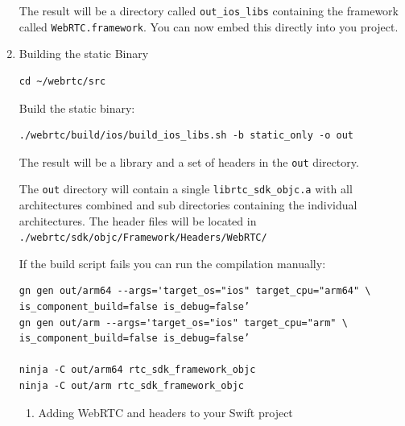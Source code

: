 \documentclass[a4paper,11pt]{article}
\begin{document}
\begin{enumerate}
The result will be a directory called \texttt{out\_ios\_libs} containing the
framework called \texttt{WebRTC.framework}.  You can now embed this directly
into you project.

\item Building the static Binary
\label{sec:org7438bc4}

\begin{verbatim}
cd ~/webrtc/src
\end{verbatim}

Build the static binary:

\begin{verbatim}
./webrtc/build/ios/build_ios_libs.sh -b static_only -o out
\end{verbatim}

The result will be a library and a set of headers in the \texttt{out}
directory.

The \texttt{out} directory will contain a single \texttt{librtc\_sdk\_objc.a} with all
architectures combined and sub directories containing the individual
architectures.  The header files will be located in
\texttt{./webrtc/sdk/objc/Framework/Headers/WebRTC/}

If the build script fails you can run the compilation manually:

\begin{verbatim}
gn gen out/arm64 --args='target_os="ios" target_cpu="arm64" \
is_component_build=false is_debug=false’
gn gen out/arm --args='target_os="ios" target_cpu="arm" \ 
is_component_build=false is_debug=false’

ninja -C out/arm64 rtc_sdk_framework_objc
ninja -C out/arm rtc_sdk_framework_objc
\end{verbatim}


\begin{enumerate}
\item Adding WebRTC and headers to your Swift project
\label{sec:org9e17891}


\end{enumerate}
\end{enumerate}
\end{document}
